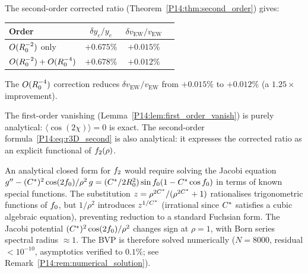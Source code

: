 \begin{corollary}
\label{P14:cor:yukawa_second}
The second-order corrected ratio (Theorem~\ref{P14:thm:second_order}) gives:
\begin{center}
\renewcommand{\arraystretch}{1.2}
\begin{tabular}{lccc}
\toprule
Order & $\delta y_e/y_e$ & $\delta v_\mathrm{EW}/v_\mathrm{EW}$ \\
\midrule
$O(R_0^{-2})$ only & $+0.675\%$ & $+0.015\%$ \\
$O(R_0^{-2})+O(R_0^{-4})$ & $+0.678\%$ & $+0.012\%$ \\
\bottomrule
\end{tabular}
\end{center}
The $O(R_0^{-4})$ correction reduces $\delta v_\mathrm{EW}/v_\mathrm{EW}$
from $+0.015\%$ to $+0.012\%$ (a $1.25\times$ improvement).
\end{corollary}

\begin{remark}
\label{P14:rem:analytical_structure}
The first-order vanishing (Lemma~\ref{P14:lem:first_order_vanish}) is purely analytical:
$\langle\cos(2\chi)\rangle=0$ is exact.
The second-order formula~\eqref{P14:eq:r3D_second} is also analytical: it expresses
the corrected ratio as an explicit functional of $f_2(\rho)$.

An analytical closed form for $f_2$ would require solving the Jacobi equation
$g'' - (C^*)^2\cos(2f_0)/\rho^2\,g = (C^*/2R_0^2)\sin f_0(1-C^*\cos f_0)$
in terms of known special functions.
The substitution $z=\rho^{2C^*}/(\rho^{2C^*}+1)$ rationalises trigonometric
functions of $f_0$, but $1/\rho^2$ introduces $z^{1/C^*}$ (irrational since
$C^*$ satisfies a cubic algebraic equation), preventing reduction to a standard
Fuchsian form.
The Jacobi potential $(C^*)^2\cos(2f_0)/\rho^2$ changes sign at $\rho=1$,
with Born series spectral radius $\approx1$.
The BVP is therefore solved numerically ($N=8000$, residual $<10^{-10}$,
asymptotics verified to $0.1\%$; see Remark~\ref{P14:rem:numerical_solution}).
\end{remark}

